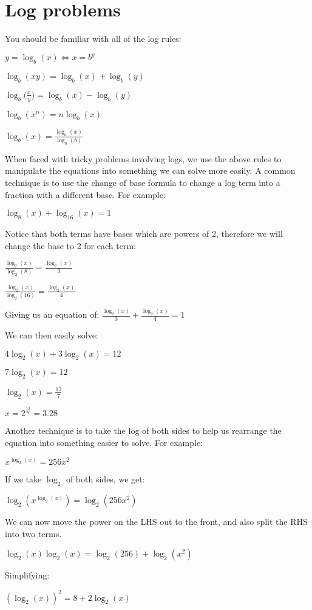 \documentclass[../main.tex]{subfiles}
\begin{document}
\section{Log problems}
You should be familiar with all of the log rules:

\(y=\log_b(x) \Longleftrightarrow x=b^y \)

\(\log_b(xy)=\log_b(x)+\log_b(y) \)

\(\log_b\bigl(\frac{x}{y}\bigr)=\log_b(x)-\log_b(y) \)

\(\log_b(x^n)=n\log_b(x) \)

\(\log_b(x)=\frac{\log_a(x)}{\log_a(b)} \)

When faced with tricky problems involving logs, we use the above rules to manipulate the equations into something we can solve more easily.
A common technique is to use the change of base formula to change a log term into a fraction with a different base. For example:

\(\log_8(x)+\log_{16}(x)=1 \)

Notice that both terms have bases which are powers of 2, therefore we will change the base to 2 for each term:

\(\frac{\log_2(x)}{\log_2(8)}=\frac{\log_2(x)}{3} \)

\(\frac{\log_2(x)}{\log_2(16)}=\frac{\log_2(x)}{4} \)

Giving us an equation of: \(\frac{\log_2(x)}{3}+\frac{\log_2(x)}{4}=1\)

We can then easily solve:

\(4\log_2(x)+3\log_2(x)=12\)

\(7\log_2(x)=12\)

\(\log_2(x)=\frac{12}{7}\)

\(x=2^{\frac{12}{7}}=3.28\)

Another technique is to take the log of both sides to help us rearrange the equation into something easier to solve. For example:

\(x^{\log_2(x)}=256x^2 \)

If we take $\log_2$ of both sides, we get:

\(\log_2(x^{\log_2(x)})=\log_2(256x^2)\)

We can now move the power on the LHS out to the front, and also split the RHS into two terms.

\(\log_2(x)\log_2(x)=\log_2(256)+\log_2(x^2)\)

Simplifying:

\((\log_2(x))^2=8+2\log_2(x)\)
\end{document}
